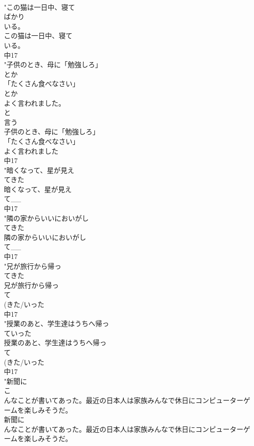 \documentclass[8pt]{extreport}
\begin{document}
\begin{CJK}{UTF8}{min}
\\	"この猫は一日中、寝て
\\	ばかり
\\	いる。
\\	この猫は一日中、寝て
\\	いる。
\\	中17
\\	"子供のとき、母に「勉強しろ」
\\	とか
\\	「たくさん食べなさい」
\\	とか
\\	よく言われました。
\\	と
\\	言う
\\	子供のとき、母に「勉強しろ」
\\	「たくさん食べなさい」
\\	よく言われました
\\	中17
\\	"暗くなって、星が見え
\\	てきた
\\	暗くなって、星が見え
\\	て__
\\	中17
\\	"隣の家からいいにおいがし
\\	てきた
\\	隣の家からいいにおいがし
\\	て__
\\	中17
\\	"兄が旅行から帰っ
\\	てきた
\\	兄が旅行から帰っ
\\	て
\\	(きた/いった
\\	中17
\\	"授業のあと、学生達はうちへ帰っ
\\	ていった
\\	授業のあと、学生達はうちへ帰っ
\\	て
\\	(きた/いった
\\	中17
\\	"新聞に
\\	こ
\\	んなことが書いてあった。最近の日本人は家族みんなで休日にコンピューターゲームを楽しみそうだ。
\\	新聞に
\\	んなことが書いてあった。最近の日本人は家族みんなで休日にコンピューターゲームを楽しみそうだ。

\end{CJK}
\end{document}
